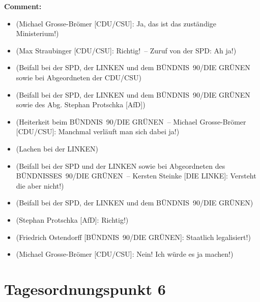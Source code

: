 \documentclass{article}
\begin{document}
\noindent\textbf{Comment:}
\begin{itemize}
    \setlength\itemsep{-3pt}
    \item (Michael Grosse-Brömer [CDU/CSU]: Ja, das ist das zuständige Ministerium!)
    \setlength\itemsep{-3pt}
    \item (Max Straubinger [CDU/CSU]: Richtig! – Zuruf von der SPD: Ah ja!)
    \setlength\itemsep{-3pt}
    \item (Beifall bei der SPD, der LINKEN und dem BÜNDNIS 90/DIE GRÜNEN sowie bei Abgeordneten der CDU/CSU)
    \setlength\itemsep{-3pt}
    \item (Beifall bei der SPD, der LINKEN und dem BÜNDNIS 90/DIE GRÜNEN sowie des Abg. Stephan Protschka [AfD])
    \setlength\itemsep{-3pt}
    \item (Heiterkeit beim BÜNDNIS 90/DIE GRÜNEN – Michael Grosse-Brömer [CDU/CSU]: Manchmal verläuft man sich dabei ja!)
    \setlength\itemsep{-3pt}
    \item (Lachen bei der LINKEN)
    \setlength\itemsep{-3pt}
    \item (Beifall bei der SPD und der LINKEN sowie bei Abgeordneten des BÜNDNISSES 90/DIE GRÜNEN – Kersten Steinke [DIE LINKE]: Versteht die aber nicht!)
    \setlength\itemsep{-3pt}
    \item (Beifall bei der SPD, der LINKEN und dem BÜNDNIS 90/DIE GRÜNEN)
    \setlength\itemsep{-3pt}
    \item (Stephan Protschka [AfD]: Richtig!)
    \setlength\itemsep{-3pt}
    \item (Friedrich Ostendorff [BÜNDNIS 90/DIE GRÜNEN]: Staatlich legalisiert!)
    \setlength\itemsep{-3pt}
    \item (Michael Grosse-Brömer [CDU/CSU]: Nein! Ich würde es ja machen!)
\end{itemize}
\section{Tagesordnungspunkt 6}
\end{document}
